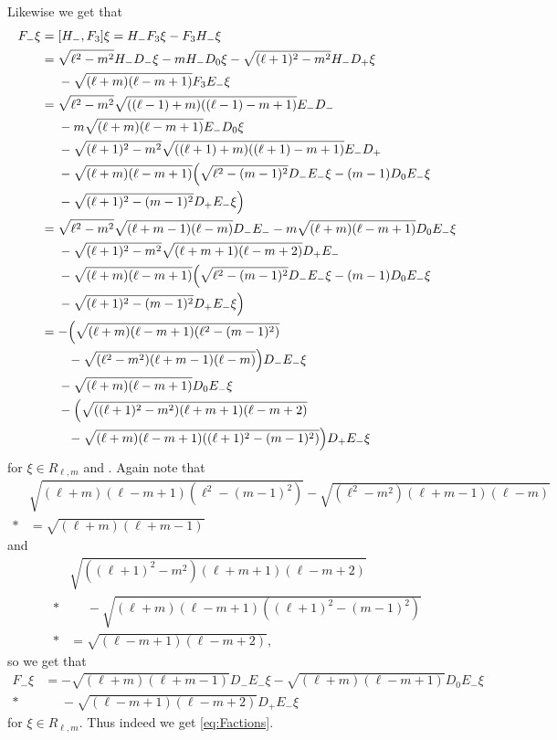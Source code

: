 Likewise we get that
\begin{align*}
  F_- \xi &= [H_-,F_3] \xi = H_-F_3 \xi - F_3H_- \xi \\
          &= \sqrt{\ell^2-m^2} H_-D_- \xi - m H_-D_0 \xi - \sqrt{(\ell+1)^2-m^2} H_-D_+ \xi \\*
          &\phantom{{}={}}{} - \sqrt{(\ell+m)(\ell-m+1)} F_3 E_-\xi \\
          &= \sqrt{\ell^2-m^2} \sqrt{((\ell-1)+m)((\ell-1)-m+1)} E_-D_- \\*
          &\phantom{{}={}}{} - m\sqrt{(\ell+m)(\ell-m+1)} E_-D_0\xi \\*
          &\phantom{{}={}}{} - \sqrt{(\ell+1)^2-m^2}\sqrt{((\ell+1)+m)((\ell+1)-m+1)} E_-D_+ \\*
          &\phantom{{}={}}{} - \sqrt{(\ell+m)(\ell-m+1)} \Bigl( \sqrt{\ell^2-(m-1)^2}D_-E_-\xi - (m-1)D_0E_-\xi \\*
          &\phantom{{}={}}{} - \sqrt{(\ell+1)^2-(m-1)^2} D_+E_-\xi \Bigr) \\
          &= \sqrt{\ell^2-m^2} \sqrt{(\ell+m-1)(\ell-m)} D_-E_- - m\sqrt{(\ell+m)(\ell-m+1)} D_0E_-\xi \\*
          &\phantom{{}={}}{} - \sqrt{(\ell+1)^2-m^2}\sqrt{(\ell+m+1)(\ell-m+2)} D_+E_- \\*
          &\phantom{{}={}}{} - \sqrt{(\ell+m)(\ell-m+1)} \Bigl( \sqrt{\ell^2-(m-1)^2}D_-E_-\xi - (m-1)D_0E_-\xi \\*
          &\phantom{{}={}}{} - \sqrt{(\ell+1)^2-(m-1)^2} D_+E_-\xi \Bigr) \\
          &= -\Bigl( \sqrt{(\ell+m)(\ell-m+1)(\ell^2-(m-1)^2)} \\*
          &\phantom{{}={}()}{} - \sqrt{(\ell^2-m^2)(\ell+m-1)(\ell-m)}  \Bigr)D_-E_-\xi \\*
          &\phantom{{}={}}{} - \sqrt{(\ell+m)(\ell-m+1)} D_0E_-\xi \\*
          &\phantom{{}={}}{} - \Bigl( \sqrt{((\ell+1)^2-m^2)(\ell+m+1)(\ell-m+2)} \\*
          &\phantom{{}={}()}{} - \sqrt{(\ell+m)(\ell-m+1)((\ell+1)^2-(m-1)^2)}\Bigr)D_+E_-\xi
\end{align*}
for $\xi\in R_{\ell,m}$ and . Again note that
\begin{align*}
  &\sqrt{(\ell+m)(\ell-m+1)(\ell^2-(m-1)^2)} - \sqrt{(\ell^2-m^2)(\ell+m-1)(\ell-m)} \\*
  &= \sqrt{(\ell+m)(\ell+m-1)}
\end{align*}
and
\begin{align*}
  &\sqrt{((\ell+1)^2-m^2)(\ell+m+1)(\ell-m+2)} \\*
  &\phantom{{}={}}{} - \sqrt{(\ell+m)(\ell-m+1)((\ell+1)^2-(m-1)^2)} \\*
  &= \sqrt{(\ell-m+1)(\ell-m+2)},
\end{align*}
so we get that
\begin{align*}
  F_- \xi &= -\sqrt{(\ell+m)(\ell+m-1)} D_-E_- \xi - \sqrt{(\ell+m)(\ell-m+1)} D_0E_- \xi \\*
  &\phantom{{}={}}{} - \sqrt{(\ell-m+1)(\ell-m+2)} D_+E_- \xi
\end{align*}
for $\xi\in R_{\ell,m}$. Thus indeed we get \cref{eq:Factions}. 

